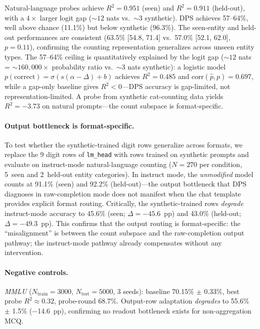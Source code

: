 \documentclass{article}
\begin{document}
Natural-language probes achieve $R^2 = 0.951$ (seen) and $R^2 = 0.911$ (held-out), with a $4\times$ larger logit gap (${\sim}12$ nats vs.\ ${\sim}3$ synthetic).
DPS achieves 57--64\%, well above chance (11.1\%) but below synthetic (96.3\%).
The seen-entity and held-out performances are consistent
(63.5\% [54.8, 71.4] vs.\ 57.0\% [52.1, 62.0], $p = 0.11$),
confirming the counting representation generalizes across unseen entity types.
The 57--64\% ceiling is quantitatively explained by the logit gap (${\sim}12$ nats = ${\sim}160{,}000\times$ probability ratio vs.\ ${\sim}3$ nats synthetic):
a logistic model $p(\text{correct})=\sigma(s(\alpha-\Delta)+b)$ achieves $R^2=0.485$ and corr$(\hat p,p)=0.697$, while a gap-only baseline gives $R^2<0$---DPS accuracy is gap-limited, not representation-limited.
A probe from synthetic cat-counting data yields $R^2 = -3.73$ on natural prompts---the count subspace is format-specific.

\paragraph{Output bottleneck is format-specific.}
To test whether the synthetic-trained digit rows generalize across formats,
we replace the 9 digit rows of \texttt{lm\_head} with rows trained on synthetic
prompts and evaluate on instruct-mode natural-language counting
($N = 270$ per condition, 5~seen and 2~held-out entity categories).
In instruct mode, the \emph{unmodified} model counts at 91.1\% (seen) and 92.2\% (held-out)---the
output bottleneck that DPS diagnoses in raw-completion mode does not manifest when the
chat template provides explicit format routing.
Critically, the synthetic-trained rows \emph{degrade} instruct-mode accuracy to
45.6\% (seen; $\Delta = -45.6$~pp) and 43.0\% (held-out; $\Delta = -49.3$~pp).
This confirms that the output routing is format-specific: the ``misalignment'' is
between the count subspace and the raw-completion output pathway;
the instruct-mode pathway already compensates without any intervention.

\paragraph{Negative controls.}

\emph{MMLU} ($N_{\text{train}}{=}3000$, $N_{\text{test}}{=}5000$, 3 seeds):
baseline 70.15\% $\pm$ 0.33\%, best probe $R^2 \approx 0.32$, probe-round 68.7\%.
Output-row adaptation \emph{degrades} to 55.6\% $\pm$ 1.5\% ($-$14.6~pp), confirming no readout bottleneck exists for non-aggregation MCQ.
\end{document}
